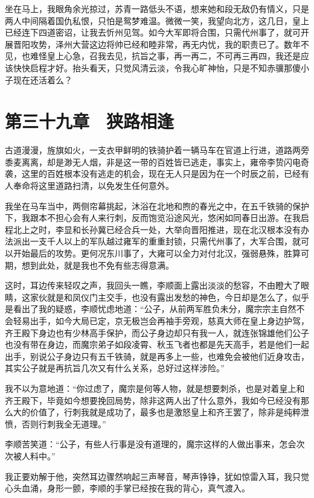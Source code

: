 坐在马上，我眼角余光掠过，苏青一路低头不语，想来她和段无敌仍有情义，只是两人中间隔着国仇私恨，只怕是鸳梦难温。微微一笑，我望向北方，这几日，皇上已经连下四道密诏，让我去忻州见驾。如今大军即将合围，只需代州事了，就可开展晋阳攻势，泽州大营这边将帅已经和睦非常，再无内忧，我的职责已了。数年不见，也难怪皇上心急，召我去见，抗旨之事，再一再二，不可再三再四，我还是应该快快启程才好。抬头看天，只觉风清云淡，令我心旷神怡，只是不知赤骥那傻小子现在还活着么？

\chapter{第三十九章　狭路相逢}

古道漫漫，旌旗如火，一支衣甲鲜明的铁骑护着一辆马车在官道上行进，道路两旁黍麦离离，却是渺无人烟，非是这一带的百姓皆已逃走，事实上，雍帝李贽闪电奇袭，这里的百姓根本没有逃走的机会，现在无人只是因为在一个时辰之前，已经有人奉命将这里道路扫清，以免发生任何意外。

我坐在马车当中，两侧帘幕挑起，沐浴在北地和煦的春光之中，在五千铁骑的保护下，我跟本不担心会有人来行刺，反而饱览沿途风光，悠闲如同春日出游。在我启程北上之时，李显和长孙冀已经合兵一处，大举向晋阳推进，现在北汉根本没有办法派出一支千人以上的军队越过雍军的重重封锁，只需代州事了，大军合围，就可以开始最后的攻势。更何况东川事了，大雍可以全力对付北汉，强弱悬殊，胜算可期，想到此处，就是我也不免有些志得意满。

这时，耳边传来轻叹之声，我回头一瞧，李顺面上露出淡淡的愁容，不由瞪大了眼睛，这家伙就是和凤仪门主交手，也没有露出发愁的神色，今日却是怎么了，似乎是看出了我的疑惑，李顺忧虑地道：“公子，从前两军胜负未分，魔宗宗主自然不会轻易出手，如今大局已定，京无极岂会再袖手旁观，慈真大师在皇上身边护驾，齐王殿下身边也有少林高手保护，而公子身边却只有我一人，就连张锦雄他们公子也没有带在身边，而魔宗弟子如段凌霄、秋玉飞者也都是先天高手，若是他们一起出手，别说公子身边只有五千铁骑，就是再多上一些，也难免会被他们近身攻击，其实公子就是再抗旨几次又有什么关系，总好过这样涉险。”

我不以为意地道：“你过虑了，魔宗是何等人物，就是想要刺杀，也是对着皇上和齐王殿下，毕竟如今想要挽回局势，除非这两人出了什么意外，我如今已经没有那么大的价值了，行刺我就是成功了，最多也是激怒皇上和齐王罢了，除非是纯粹泄愤，否则行刺我全无道理。”

李顺苦笑道：“公子，有些人行事是没有道理的，魔宗这样的人做出事来，怎会次次被人料中。”

我正要劝解于他，突然耳边骤然响起三声琴音，琴声铮铮，犹如惊雷入耳，我只觉心头血涌，身形一颤，李顺的手掌已经按在我的背心，真气渡入。


